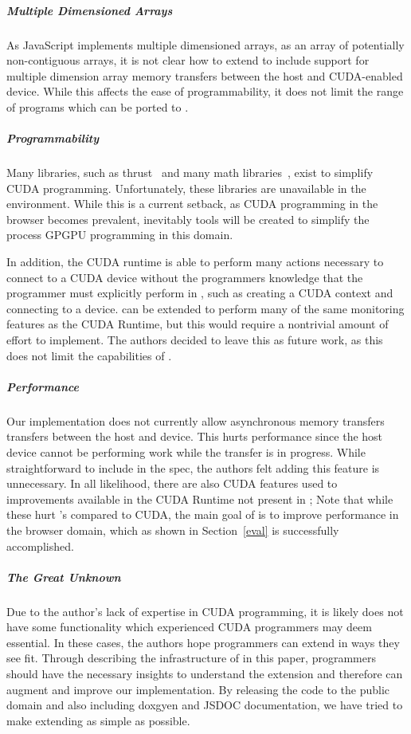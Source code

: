 \subparagraph{Multiple Dimensioned Arrays}
As JavaScript implements multiple dimensioned arrays, as an array of potentially
non-contiguous arrays, it is not clear how to extend \name to include
support for multiple dimension array memory transfers between the host and
CUDA-enabled device. While this affects the ease of programmability, it does not
limit the range of programs which can be ported to \namens.

\subparagraph{Programmability} 
Many libraries, such as thrust~\cite{thrust} and
many math libraries~\cite{magma, cuSparse, arrayFire}, exist to simplify CUDA
programming. Unfortunately, these libraries are unavailable in the \name environment. While
this is a current setback, as CUDA programming in the browser becomes prevalent,
inevitably tools will be created to simplify the process GPGPU programming in
this domain.

In addition, the CUDA runtime is able to perform many actions necessary to
connect to a CUDA device without the programmers knowledge that the programmer
must explicitly perform in \namens, such as creating a CUDA context and
connecting to a device. \name can be extended to perform many of the same
monitoring features as the CUDA Runtime, but this would require a nontrivial
amount of effort to implement. The authors decided to leave this as future work,
as this does not limit the capabilities of \namens.

\subparagraph{Performance}
Our implementation does not currently allow asynchronous memory transfers
transfers between the host and device. This hurts performance since the host
device cannot be performing work while the transfer is in progress. While
straightforward to include in the \name spec, the authors felt adding this
feature is unnecessary. In all likelihood, there are also CUDA features used to
improvements available in the CUDA Runtime not present in \namens; Note that
while these hurt \namens's compared to CUDA, the main goal of \name is to
improve performance in the browser domain, which as shown in Section~\ref{eval}
is successfully accomplished.

\subparagraph{The Great Unknown}
Due to the author's lack of expertise in CUDA programming, it is likely \name
does not have some functionality which experienced CUDA programmers may deem
essential. In these cases, the authors hope programmers can extend \name in
ways they see fit. Through describing the infrastructure of \name in this paper,
programmers should have the necessary insights to understand the \name
extension and therefore can augment and improve our implementation. By releasing
the code to the public domain and also including doxgyen and
JSDOC documentation, we have tried to make extending \name as simple as
possible.


